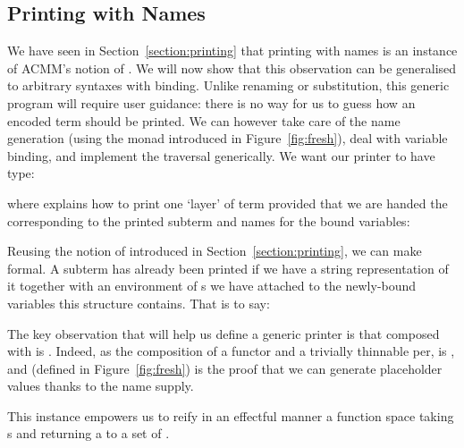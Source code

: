 
\subsection{Printing with Names}\label{section:genericprinting}

We have seen in Section~\ref{section:printing} that printing with names
is an instance of ACMM's notion of \semrec{}. We will now show that this
observation can be generalised to arbitrary syntaxes with binding. Unlike
renaming or substitution, this generic program will require user guidance:
there is no way for us to guess how an encoded term should be printed. We
can however take care of the name generation (using the monad 
introduced in Figure~\ref{fig:fresh}), deal with variable binding,
and implement the traversal generically. We want our printer to have type:
\begin{agdasnippet}
\end{agdasnippet}
%
where  explains how to print one `layer' of term provided that
we are handed the  corresponding to the printed subterm and
names for the bound variables:
\begin{agdasnippet}
\end{agdasnippet}
%
Reusing the notion of  introduced in Section~\ref{section:printing},
we can make  formal. A subterm has already been printed if we
have a string representation of it together with an environment of s
we have attached to the newly-bound variables this structure contains.
That is to say:
%
\begin{agdasnippet}
\end{agdasnippet}
%
The key observation that will help us define a generic printer is that
 composed with  is . Indeed, as the composition
of a functor and a trivially thinnable per,  is ,
and  (defined in Figure~\ref{fig:fresh}) is the proof that we
can generate placeholder values thanks to the name supply.

\begin{agdasnippet}
\end{agdasnippet}

This  instance empowers us to reify in an effectful manner
a  function space taking s and returning a 
to a set of .

